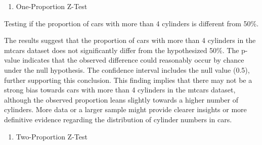 \documentclass[
]{book}
\newenvironment{Shaded}{\begin{snugshade}}{\end{snugshade}}
\newcommand{\AttributeTok}[1]{\textcolor[rgb]{0.13,0.29,0.53}{#1}}
\newcommand{\CommentTok}[1]{\textcolor[rgb]{0.56,0.35,0.01}{\textit{#1}}}
\newcommand{\DecValTok}[1]{\textcolor[rgb]{0.00,0.00,0.81}{#1}}
\newcommand{\FloatTok}[1]{\textcolor[rgb]{0.00,0.00,0.81}{#1}}
\newcommand{\FunctionTok}[1]{\textcolor[rgb]{0.13,0.29,0.53}{\textbf{#1}}}
\newcommand{\NormalTok}[1]{#1}
\newcommand{\SpecialCharTok}[1]{\textcolor[rgb]{0.81,0.36,0.00}{\textbf{#1}}}
\providecommand{\tightlist}{%
  \setlength{\itemsep}{0pt}\setlength{\parskip}{0pt}}
\begin{document}
\begin{enumerate}
\def\labelenumi{\alph{enumi}.}
\setcounter{enumi}{2}
\tightlist
\item
  One-Proportion Z-Test
\end{enumerate}

Testing if the proportion of cars with more than 4 cylinders is different from 50\%.

\begin{Shaded}
\end{Shaded}

The results suggest that the proportion of cars with more than 4 cylinders in the mtcars dataset does not significantly differ from the hypothesized 50\%. The p-value indicates that the observed difference could reasonably occur by chance under the null hypothesis. The confidence interval includes the null value (0.5), further supporting this conclusion. This finding implies that there may not be a strong bias towards cars with more than 4 cylinders in the mtcars dataset, although the observed proportion leans slightly towards a higher number of cylinders. More data or a larger sample might provide clearer insights or more definitive evidence regarding the distribution of cylinder numbers in cars.

\begin{enumerate}
\def\labelenumi{\alph{enumi}.}
\setcounter{enumi}{3}
\tightlist
\item
  Two-Proportion Z-Test
\end{enumerate}
\end{document}
